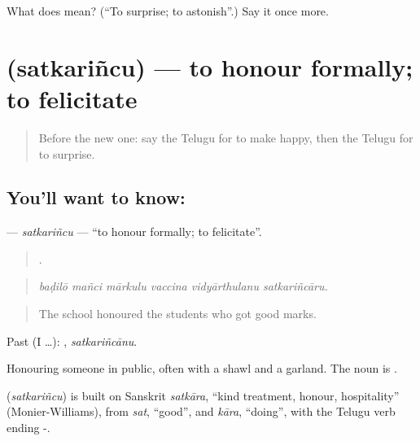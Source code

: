 \begin{tcolorbox}[breakable,colback=teal!4,colframe=teal!35!black,title={Before you move on}]
What does  mean? (\textquotedblleft{}To surprise; to astonish\textquotedblright{}.) Say it once more.
\end{tcolorbox}
\section[\texorpdfstring{\te{సత్కరించు} (satkariñcu)}{సత్కరించు (satkariñcu)}]{ (satkariñcu) — to honour formally; to felicitate}

\label{lesson:TE-C501-satkarincu}



\begin{quote}
Before the new one: say the Telugu for to make happy, then the Telugu for to surprise.
\end{quote}

\subsection*{You'll want to know: }
\textbf{} — \emph{satkariñcu} — \textquotedblleft{}to honour formally; to felicitate\textquotedblright{}.

\begin{quote}
     .
\end{quote}

\begin{quote}
\emph{baḍilō mañci mārkulu vaccina vidyārthulanu satkariñcāru.}
\end{quote}

\begin{quote}
The school honoured the students who got good marks.
\end{quote}

Past (I …): , \emph{satkariñcānu}.

Honouring someone in public, often with a shawl and a garland. The noun is .

\begin{cousinweb}
\textbf{} (\emph{satkariñcu}) is built on Sanskrit \emph{satkāra}, \textquotedblleft{}kind treatment, honour, hospitality\textquotedblright{} (Monier-Williams), from \emph{sat}, \textquotedblleft{}good\textquotedblright{}, and \emph{kāra}, \textquotedblleft{}doing\textquotedblright{}, with the Telugu verb ending -.
\end{cousinweb}

